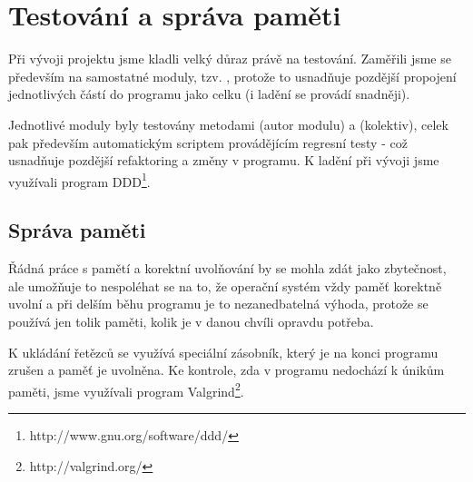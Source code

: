 \section{Testování a správa paměti}

Při vývoji projektu jsme kladli velký důraz právě na testování. Zaměřili jsme se především na samostatné moduly, tzv. , protože to usnadňuje pozdější propojení jednotlivých částí do programu jako celku (i ladění se provádí snadněji).

Jednotlivé moduly byly testovány metodami  (autor modulu) a  (kolektiv), celek pak především automatickým scriptem provádějícím regresní testy - což usnadňuje pozdější refaktoring a změny v programu. K ladění při vývoji jsme využívali program DDD\footnote{http://www.gnu.org/software/ddd/}.

\subsection{Správa paměti}

Řádná práce s pamětí a korektní uvolňování by se mohla zdát jako zbytečnost, ale umožňuje to nespoléhat se na to, že operační systém vždy paměť korektně uvolní a při delším běhu programu je to nezanedbatelná výhoda, protože se používá jen tolik paměti, kolik je v danou chvíli opravdu potřeba.

K ukládání řetězců se využívá speciální zásobník, který je na konci programu zrušen a paměť je uvolněna. Ke kontrole, zda v programu nedochází k únikům paměti, jsme využívali program Valgrind\footnote{http://valgrind.org/}.
